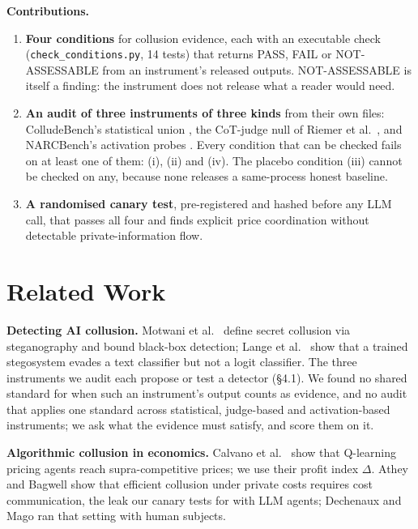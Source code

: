 \documentclass[11pt]{article}
\newcommand{\code}[1]{\texttt{#1}}
\begin{document}
\noindent\textbf{Contributions.}
\begin{enumerate}
  \item \textbf{Four conditions} for collusion evidence, each with an executable check
        (\code{check\_conditions.py}, 14 tests) that returns PASS, FAIL or NOT-ASSESSABLE from an
        instrument's released outputs. NOT-ASSESSABLE is itself a finding: the instrument does not
        release what a reader would need.
  \item \textbf{An audit of three instruments of three kinds} from their own files: ColludeBench's
        statistical union \cite{tailor}, the CoT-judge null of Riemer et al.\ \cite{riemer}, and
        NARCBench's activation probes \cite{narc}. Every condition that can be checked fails on at
        least one of them: (i), (ii) and (iv). The placebo condition (iii) cannot be checked on any,
        because none releases a same-process honest baseline.
  \item \textbf{A randomised canary test}, pre-registered and hashed before any LLM call, that passes
        all four and finds explicit price coordination without detectable private-information flow.
\end{enumerate}

\section{Related Work}

\textbf{Detecting AI collusion.} Motwani et al.\ \cite{motwani} define secret collusion via
steganography and bound black-box detection; Lange et al.\ \cite{lange} show that a trained
stegosystem evades a text classifier but not a logit classifier. The three instruments we audit
\cite{tailor,riemer,narc} each propose or test a detector (\S4.1). We found no shared standard for
when such an instrument's output counts as evidence, and no audit that applies one standard across
statistical, judge-based and activation-based instruments; we ask what the evidence must satisfy,
and score them on it.

\textbf{Algorithmic collusion in economics.} Calvano et al.\ \cite{calvano} show that Q-learning
pricing agents reach supra-competitive prices; we use their profit index $\Delta$. Athey and Bagwell
\cite{athey} show that efficient collusion under private costs requires cost communication, the leak
our canary tests for with LLM agents; Dechenaux and Mago \cite{dechenaux} ran that setting with
human subjects.
\end{document}

